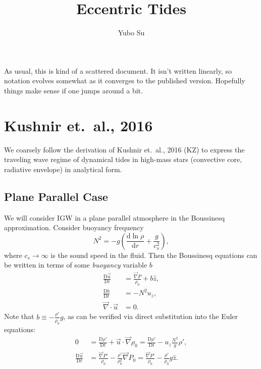 \documentclass[11pt,
        usenames, %
        dvipsnames %
    ]{article}
\newcommand*{\rd}[2]{\frac{\mathrm{d}#1}{\mathrm{d}#2}}
\newcommand*{\md}[2]{\frac{\mathrm{D}#1}{\mathrm{D}#2}}
\newcommand*{\p}[1]{\left(#1\right)}
\begin{document}
\renewcommand*{\sectionautorefname}{\Snospace}
\renewcommand*{\appendixautorefname}{\Snospace}
\renewcommand*{\figureautorefname}{Fig.}
\renewcommand*{\equationautorefname}{Eq.}
\renewcommand*{\tableautorefname}{Tab.}

\onehalfspacing

\pagestyle{fancy}
\rhead{}
\cfoot{\thepage/\pageref{LastPage}}

\title{Eccentric Tides}
\author{Yubo Su}

\maketitle

As usual, this is kind of a scattered document. It isn't written linearly, so
notation evolves somewhat as it converges to the published version. Hopefully
things make sense if one jumps around a bit.

\section{Kushnir et.\ al., 2016}

We coarsely follow the derivation of Kushnir et.\ al., 2016 (KZ) to express the
traveling wave regime of dynamical tides in high-mass stars (convective core,
radiative envelope) in analytical form.

\subsection{Plane Parallel Case}

We will consider IGW in a plane parallel atmosphere in the Boussinesq
approximation. Consider buoyancy frequency
\begin{equation}
    N^2 = -g\p{\rd{\ln \rho}{r} + \frac{g}{c_s^2}},
\end{equation}
where $c_s \to \infty$ is the sound speed in the fluid. Then the Boussinesq
equations can be written in terms of some \emph{buoyancy} variable $b$
\begin{subequations}\label{eq:bouss}
    \begin{align}
        \md{\vec{u}}{t} &= \frac{\vec{\nabla}P}{\rho_0} + b\hat{z},\\
        \md{b}{t} &= -N^2 u_z,\\
        \vec{\nabla} \cdot \vec{u} &= 0.
    \end{align}
\end{subequations}
Note that $b \equiv -\frac{\rho'}{\rho_0} g$, as can be verified via
direct substitution into the Euler equations:
\begin{subequations}\label{eq:bouss}
    \begin{align}
        0 &= \md{\rho'}{t} + \vec{u} \cdot \vec{\nabla}\rho_0 =
            \md{\rho'}{t} - u_z \frac{N^2}{g} \rho',\\
        \md{\vec{u}}{t} &= \frac{\vec{\nabla}P'}{\rho_0}
                - \frac{\rho'}{\rho_0^2} \vec{\nabla} P_0
            = \frac{\vec{\nabla}P'}{\rho_0} - \frac{\rho'}{\rho_0}g\hat{z}.
    \end{align}
\end{subequations}
\end{document}

